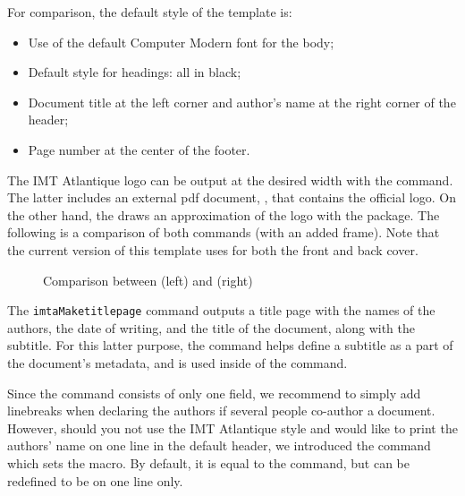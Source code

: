 \documentclass{report}
\begin{document}
\vspace{1em}
For comparison, the default style of the template is:

\begin{itemize}
    \item Use of the default Computer Modern font for the body;
    \item Default style for headings: all in black;
    \item Document title at the left corner and author's name at the right corner of the header;
    \item Page number at the center of the footer.
\end{itemize}


The IMT Atlantique logo can be output at the desired width with the  command.
The latter includes an external pdf document, , that contains the official logo.
On the other hand, the  draws an approximation of the logo with the  package.
The following is a comparison of both commands (with an added frame). Note that the current version of this template uses  for both the front and back cover.

\begin{figure}[H]
    \centering
    \fbox{\imtaLogo{5cm}}
    \fbox{\imtaLogo{5cm}}
    \caption{Comparison between  (left) and  (right)}
    \label{fig:imtaLogo}
\end{figure}


The \texttt{imtaMaketitlepage} command outputs a title page with the names of the authors, the date of writing, and the title of the document, along with the subtitle.
For this latter purpose, the  command helps define a subtitle as a part of the document's metadata, and %
is used inside of the  command.

Since the  command consists of only one field, we recommend to simply add linebreaks when declaring the authors if several people co-author a document. 
However, should you not use the IMT Atlantique style and would like to print the authors' name on one line in the default header, we introduced the  command which sets the  macro. 
By default, it is equal to the  command, but can be redefined to be on one line only.
\end{document}
